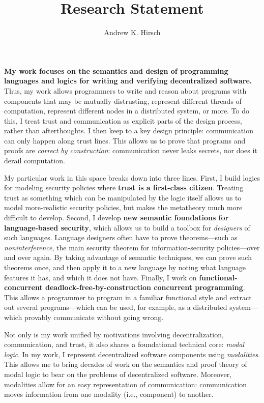\documentclass{article}
\author{Andrew K. Hirsch}
\title{Research Statement}
\date{}
\theoremstyle{definition}
\begin{document}
\maketitle

\textbf{My work focuses on the semantics and design of programming languages and logics for writing and verifying decentralized software.}
Thus, my work allows programmers to write and reason about programs with components that may be mutually-distrusting, represent different threads of computation, represent different nodes in a distributed system, or more.
To do this, I treat trust and communication as explicit parts of the design process, rather than afterthoughts.
I then keep to a key design principle: communication can only happen along trust lines.
This allows us to prove that programs and proofs are \emph{correct by construction}: communication never leaks secrets, nor does it derail computation.

My particular work in this space breaks down into three lines.
First, I build logics for modeling security policies where \textbf{trust is a first-class citizen}.
Treating trust as something which can be manipulated by the logic itself allows us to model more-realistic security policies, but makes the metatheory much more difficult to develop.
Second, I develop \textbf{new semantic foundations for language-based security}, which allows us to build a toolbox for \emph{designers} of such languages.
Language designers often have to prove theorems---such as \emph{noninterference}, the main security theorem for information-security policies---over and over again.
By taking advantage of semantic techniques, we can prove such theorems once, and then apply it to a new language by noting what language features it has, and which it does not have.
Finally, I work on \textbf{functional-concurrent deadlock-free-by-construction concurrent programming}.
This allows a programmer to program in a familiar functional style and extract out several programs---which can be used, for example, as a distributed system---which provably communicate without going wrong.

Not only is my work unified by motivations involving decentralization, communication, and trust, it also shares a foundational technical core: \emph{modal logic}.
In my work, I represent decentralized software components using \emph{modalities}.
This allows me to bring decades of work on the semantics and proof theory of modal logic to bear on the problems of decentralized software.
Moreover, modalities allow for an easy representation of communication: communication moves information from one modality (i.e., component) to another.
\end{document}
